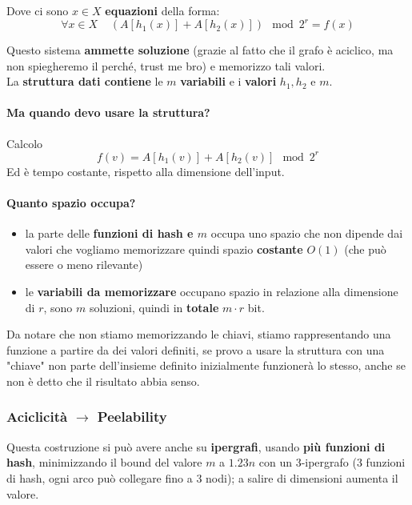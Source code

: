 Dove ci sono $x \in X$ \textbf{equazioni} della forma:
$$ \forall x \in X \;\;\;\; \left(A[h_1 (x)] + A[h_2(x)]\right) \mod 2^r = f(x) $$

Questo sistema \textbf{ammette soluzione} (grazie al fatto che il grafo è aciclico, ma non spiegheremo il perché, trust me bro) e memorizzo tali valori.\\

La \textbf{struttura dati contiene} le $m$ \textbf{variabili} e i \textbf{valori} $h_1,h_2$ e $m$.\\

\paragraph{Ma quando devo usare la struttura?} Calcolo
$$ f(v) = A[h_1(v)] + A[h_2 (v)] \mod 2^r $$
Ed è tempo costante, rispetto alla dimensione dell'input.\\

\paragraph{Quanto spazio occupa?}
\begin{itemize}
	\item la parte delle \textbf{funzioni di hash e $m$} occupa uno spazio che non dipende dai valori che vogliamo memorizzare quindi spazio \textbf{costante} $O(1)$ (che può essere o meno rilevante)
	\item le \textbf{variabili da memorizzare} occupano spazio in relazione alla dimensione di $r$, sono $m$ soluzioni, quindi in \textbf{totale} $m \cdot r$ bit.\\
\end{itemize}

Da notare che non stiamo memorizzando le chiavi, stiamo rappresentando una funzione a partire da dei valori definiti, se provo a usare la struttura con una "chiave" non parte dell'insieme definito inizialmente funzionerà lo stesso, anche se non è detto che il risultato abbia senso.\\

\newpage

\subsubsection{Aciclicità $\rightarrow$ Peelability}
Questa costruzione si può avere anche su \textbf{ipergrafi}, usando \textbf{più funzioni di hash}, minimizzando il bound del valore $m$ a $1.23n$ con un 3-ipergrafo (3 funzioni di hash, ogni arco può collegare fino a 3 nodi); a salire di dimensioni aumenta il valore.\\

